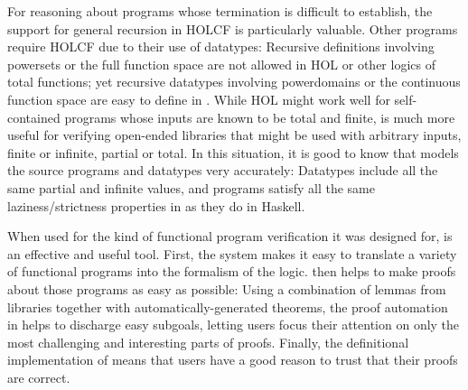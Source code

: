 For reasoning about programs whose termination is difficult to establish, the support for general recursion in HOLCF is particularly valuable. Other programs require HOLCF due to their use of datatypes: Recursive definitions involving powersets or the full function space are not allowed in HOL or other logics of total functions; yet recursive datatypes involving powerdomains or the continuous function space are easy to define in . While HOL might work well for self-contained programs whose inputs are known to be total and finite,  is much more useful for verifying open-ended libraries that might be used with arbitrary inputs, finite or infinite, partial or total. In this situation, it is good to know that  models the source programs and datatypes very accurately: Datatypes include all the same partial and infinite values, and programs satisfy all the same laziness/strictness properties in  as they do in Haskell.

When used for the kind of functional program verification it was designed for,  is an effective and useful tool. First, the system makes it easy to translate a variety of functional programs into the formalism of the logic.  then helps to make proofs about those programs as easy as possible: Using a combination of lemmas from libraries together with automatically-generated theorems, the proof automation in  helps to discharge easy subgoals, letting users focus their attention on only the most challenging and interesting parts of proofs. Finally, the definitional implementation of  means that users have a good reason to trust that their proofs are correct.
